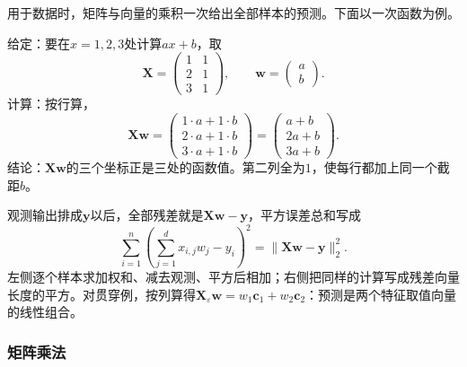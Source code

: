 用于数据时，矩阵与向量的乘积一次给出全部样本的预测。下面以一次函数为例。
\begin{example}[用矩阵与向量的乘积计算一次函数的取值]
\label{ex:ls-affine-predictions}
给定：要在$x=1,2,3$处计算$ax+b$，取
\[
\bm X=\begin{pmatrix}1&1\\2&1\\3&1\end{pmatrix},\qquad
\bm w=\begin{pmatrix}a\\b\end{pmatrix}.
\]
计算：按行算，
\[
 \bm X\bm w=\begin{pmatrix}1\cdot a+1\cdot b\\2\cdot a+1\cdot b\\3\cdot a+1\cdot b\end{pmatrix}=\begin{pmatrix}a+b\\2a+b\\3a+b\end{pmatrix}.
\]
结论：$\bm X\bm w$的三个坐标正是三处的函数值。第二列全为$1$，使每行都加上同一个截距$b$。
\end{example}

观测输出排成$\bm y$以后，全部残差就是$\bm X\bm w-\bm y$，平方误差总和写成
\[
 \sum_{i=1}^n\left(\sum_{j=1}^d x_{i,j}w_j-y_i\right)^2
 =\lVert\bm X\bm w-\bm y\rVert_2^2.
\]
左侧逐个样本求加权和、减去观测、平方后相加；右侧把同样的计算写成残差向量长度的平方。对贯穿例，按列算得$\bm X_\varepsilon\bm w=w_1\bm c_1+w_2\bm c_2$：预测是两个特征取值向量的线性组合。

\subsubsection{矩阵乘法}
\label{sec:prelim-linear-actions-composition}

